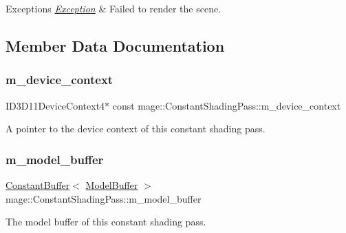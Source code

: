 \begin{DoxyExceptions}{Exceptions}
{\em \hyperlink{classmage_1_1_exception}{Exception}} & Failed to render the scene. \\
\hline
\end{DoxyExceptions}


\subsection{Member Data Documentation}
\hypertarget{classmage_1_1_constant_shading_pass_a34769eb874a24f75c1d9ed8a6610eddc}{}\label{classmage_1_1_constant_shading_pass_a34769eb874a24f75c1d9ed8a6610eddc} 
\subsubsection{\texorpdfstring{m\+\_\+device\+\_\+context}{m\_device\_context}}
{\footnotesize\ttfamily I\+D3\+D11\+Device\+Context4$\ast$ const mage\+::\+Constant\+Shading\+Pass\+::m\+\_\+device\+\_\+context\hspace{0.3cm}{\ttfamily [private]}}

A pointer to the device context of this constant shading pass. \hypertarget{classmage_1_1_constant_shading_pass_ae828b9ae1e4cd281f346aca0db34c015}{}\label{classmage_1_1_constant_shading_pass_ae828b9ae1e4cd281f346aca0db34c015} 
\subsubsection{\texorpdfstring{m\+\_\+model\+\_\+buffer}{m\_model\_buffer}}
{\footnotesize\ttfamily \hyperlink{classmage_1_1_constant_buffer}{Constant\+Buffer}$<$ \hyperlink{structmage_1_1_model_buffer}{Model\+Buffer} $>$ mage\+::\+Constant\+Shading\+Pass\+::m\+\_\+model\+\_\+buffer\hspace{0.3cm}{\ttfamily [private]}}

The model buffer of this constant shading pass. \hypertarget{classmage_1_1_constant_shading_pass_ae86bc45868ba10d2d399d27bc10534f9}{}\label{classmage_1_1_constant_shading_pass_ae86bc45868ba10d2d399d27bc10534f9} 
